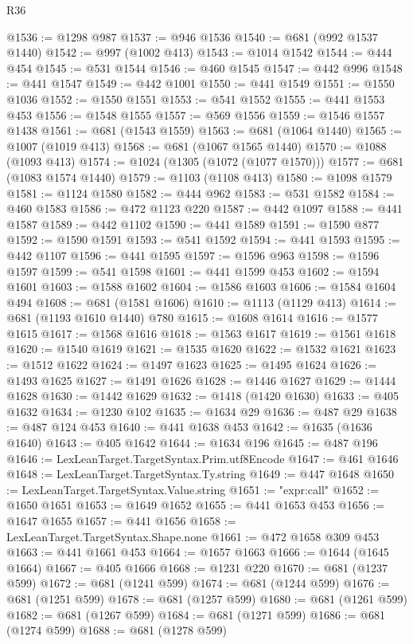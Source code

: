 \begin{lexlean}{R36}
\begin{coremodule}
@1536 := @1298 @987
@1537 := @946 @1536
@1540 := @681 (@992 @1537 @1440)
@1542 := @997 (@1002 @413)
@1543 := @1014 @1542
@1544 := @444 @454
@1545 := @531 @1544
@1546 := @460 @1545
@1547 := @442 @996
@1548 := @441 @1547
@1549 := @442 @1001
@1550 := @441 @1549
@1551 := @1550 @1036
@1552 := @1550 @1551
@1553 := @541 @1552
@1555 := @441 @1553 @453
@1556 := @1548 @1555
@1557 := @569 @1556
@1559 := @1546 @1557 @1438
@1561 := @681 (@1543 @1559)
@1563 := @681 (@1064 @1440)
@1565 := @1007 (@1019 @413)
@1568 := @681 (@1067 @1565 @1440)
@1570 := @1088 (@1093 @413)
@1574 := @1024 (@1305 (@1072 (@1077 @1570)))
@1577 := @681 (@1083 @1574 @1440)
@1579 := @1103 (@1108 @413)
@1580 := @1098 @1579
@1581 := @1124 @1580
@1582 := @444 @962
@1583 := @531 @1582
@1584 := @460 @1583
@1586 := @472 @1123 @220
@1587 := @442 @1097
@1588 := @441 @1587
@1589 := @442 @1102
@1590 := @441 @1589
@1591 := @1590 @877
@1592 := @1590 @1591
@1593 := @541 @1592
@1594 := @441 @1593
@1595 := @442 @1107
@1596 := @441 @1595
@1597 := @1596 @963
@1598 := @1596 @1597
@1599 := @541 @1598
@1601 := @441 @1599 @453
@1602 := @1594 @1601
@1603 := @1588 @1602
@1604 := @1586 @1603
@1606 := @1584 @1604 @494
@1608 := @681 (@1581 @1606)
@1610 := @1113 (@1129 @413)
@1614 := @681 (@1193 @1610 @1440) @780
@1615 := @1608 @1614
@1616 := @1577 @1615
@1617 := @1568 @1616
@1618 := @1563 @1617
@1619 := @1561 @1618
@1620 := @1540 @1619
@1621 := @1535 @1620
@1622 := @1532 @1621
@1623 := @1512 @1622
@1624 := @1497 @1623
@1625 := @1495 @1624
@1626 := @1493 @1625
@1627 := @1491 @1626
@1628 := @1446 @1627
@1629 := @1444 @1628
@1630 := @1442 @1629
@1632 := @1418 (@1420 @1630)
@1633 := @405 @1632
@1634 := @1230 @102
@1635 := @1634 @29
@1636 := @487 @29
@1638 := @487 @124 @453
@1640 := @441 @1638 @453
@1642 := @1635 (@1636 @1640)
@1643 := @405 @1642
@1644 := @1634 @196
@1645 := @487 @196
@1646 := LexLeanTarget.TargetSyntax.Prim.utf8Encode
@1647 := @461 @1646
@1648 := LexLeanTarget.TargetSyntax.Ty.string
@1649 := @447 @1648
@1650 := LexLeanTarget.TargetSyntax.Value.string
@1651 := "expr:call"
@1652 := @1650 @1651
@1653 := @1649 @1652
@1655 := @441 @1653 @453
@1656 := @1647 @1655
@1657 := @441 @1656
@1658 := LexLeanTarget.TargetSyntax.Shape.none
@1661 := @472 @1658 @309 @453
@1663 := @441 @1661 @453
@1664 := @1657 @1663
@1666 := @1644 (@1645 @1664)
@1667 := @405 @1666
@1668 := @1231 @220
@1670 := @681 (@1237 @599)
@1672 := @681 (@1241 @599)
@1674 := @681 (@1244 @599)
@1676 := @681 (@1251 @599)
@1678 := @681 (@1257 @599)
@1680 := @681 (@1261 @599)
@1682 := @681 (@1267 @599)
@1684 := @681 (@1271 @599)
@1686 := @681 (@1274 @599)
@1688 := @681 (@1278 @599)

\end{coremodule}
\end{lexlean}
